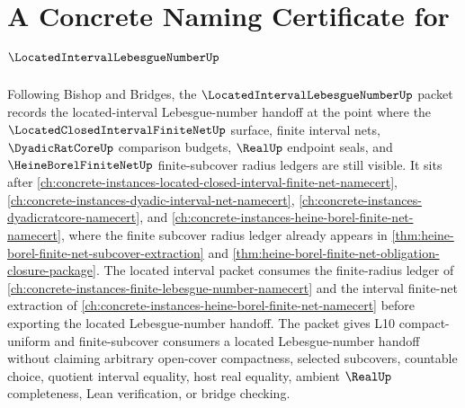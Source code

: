 \chapter{A Concrete Naming Certificate for $\LocatedIntervalLebesgueNumberUp$}
\label{ch:concrete-instances-located-interval-lebesgue-number-namecert}

Following Bishop and Bridges, the $\LocatedIntervalLebesgueNumberUp$ packet records the located-interval Lebesgue-number handoff at the point where the $\LocatedClosedIntervalFiniteNetUp$ surface, finite interval nets, $\DyadicRatCoreUp$ comparison budgets, $\RealUp$ endpoint seals, and $\HeineBorelFiniteNetUp$ finite-subcover radius ledgers are still visible. It sits after \autoref{ch:concrete-instances-located-closed-interval-finite-net-namecert}, \autoref{ch:concrete-instances-dyadic-interval-net-namecert}, \autoref{ch:concrete-instances-dyadicratcore-namecert}, and \autoref{ch:concrete-instances-heine-borel-finite-net-namecert}, where the finite subcover radius ledger already appears in \autoref{thm:heine-borel-finite-net-subcover-extraction} and \autoref{thm:heine-borel-finite-net-obligation-closure-package}. The located interval packet consumes the finite-radius ledger of \autoref{ch:concrete-instances-finite-lebesgue-number-namecert} and the interval finite-net extraction of \autoref{ch:concrete-instances-heine-borel-finite-net-namecert} before exporting the located Lebesgue-number handoff. The packet gives L10 compact-uniform and finite-subcover consumers a located Lebesgue-number handoff without claiming arbitrary open-cover compactness, selected subcovers, countable choice, quotient interval equality, host real equality, ambient $\RealUp$ completeness, Lean verification, or bridge checking.

